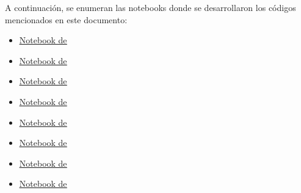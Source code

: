 A continuación, se enumeran las notebooks donde se desarrollaron los códigos mencionados en este documento:
\begin{itemize}
	\ifx \AlumnoPrimero \undefined {}
	\else
	\item \href{\URLColabAlumnoPrimero}{\underline{Notebook de \AlumnoPrimero}}
	\fi
	\ifx \AlumnoSegundo \undefined {}
	\else
	\item \href{\URLColabAlumnoSegundo}{\underline{Notebook de \AlumnoSegundo}}
	\fi
	\ifx \AlumnoTercero \undefined {}
	\else
	\item \href{\URLColabAlumnoTercero}{\underline{Notebook de \AlumnoTercero}}
	\fi
	\ifx \AlumnoCuarto \undefined {}
	\else
	\item \href{\URLColabAlumnoCuarto}{\underline{Notebook de \AlumnoCuarto}}
	\fi
	\ifx \AlumnoQuinto \undefined {}
	\else
	\item \href{\URLColabAlumnoQuinto}{\underline{Notebook de \AlumnoQuinto}}
	\fi
	\ifx \AlumnoSexto \undefined {}
	\else
	\item \href{\URLColabAlumnoSexto}{\underline{Notebook de \AlumnoSexto}}
	\fi
	\ifx \AlumnoSeptimo \undefined {}
	\else
	\item \href{\URLColabAlumnoSeptimo}{\underline{Notebook de \AlumnoSeptimo}}
	\fi
	\ifx \AlumnoOctavo \undefined {}
	\else
	\item \href{\URLColabAlumnoOctavo}{\underline{Notebook de \AlumnoOctavo}}
	\fi
\end{itemize}

